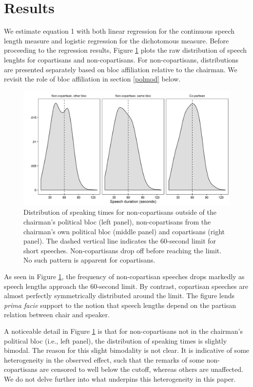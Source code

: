 \documentclass[12pt,a4paper]{article}
\begin{document}
\section{Results}\label{res}

\noindent We estimate equation 1 with both linear regression for the continuous speech length measure and logistic regression for the dichotomous measure. Before proceeding to the regression results, Figure \ref{parlbias_dens} plots the raw distribution of speech lenghts for copartisans and non-copartisans. For non-copartisans, distributions are presented separately based on bloc affiliation relative to the chairman. We revisit the role of bloc affiliation in section \ref{polmod} below.

\begin{figure}[h]
\centering
\includegraphics[scale=.70]{../figures/parlbias_dens.png}
  \caption{Distribution of speaking times for non-copartisans outside of the chairman's political bloc (left panel), non-copartisans from the chairman's own political bloc (middle panel) and copartisans (right panel). The dashed vertical line indicates the 60-second limit for short speeches. Non-copartisans drop off before reaching the limit. No such pattern is apparent for copartisans.}\label{parlbias_dens}
\end{figure}

As seen in Figure \ref{parlbias_dens}, the frequency of non-copartisan speeches drops markedly as speech lengths approach the 60-second limit. By contrast, copartisan speeches are almost perfectly symmetrically distributed around the limit. The figure lends \textit{prima facie} support to the notion that speech lengths depend on the partisan relation between chair and speaker.

A noticeable detail in Figure \ref{parlbias_dens} is that for non-copartisans not in the chairman's political bloc (i.e., left panel), the distribution of speaking times is slightly bimodal. The reason for this slight bimodality is not clear. It is indicative of some heterogeneity in the observed effect, such that the remarks of some non-copartisans are censored to well below the cutoff, whereas others are unaffected. We do not delve further into what underpins this heterogeneity in this paper.
\end{document}
